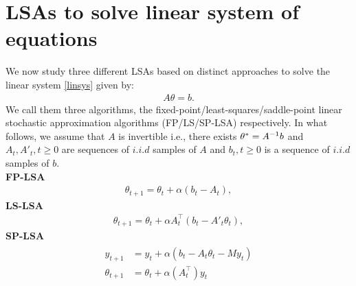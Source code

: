 \section{LSAs to solve linear system of equations}
We now study three different LSAs based on distinct approaches to solve the linear system \eqref{linsys} given by:
\begin{align}\label{linsys}
A\theta=b.
\end{align}
We call them three algorithms, the fixed-point/least-squares/saddle-point linear stochastic approximation algorithms (FP/LS/SP-LSA) respectively. In what follows, we assume that
$A$ is invertible i.e., there exists $\theta^*=A^{-1} b$ and $A_t,A'_t, t\geq 0$ are sequences of $i.i.d$ samples of $A$ and $b_t,t\geq 0$ is a sequence of $i.i.d$ samples of $b$.\\
\textbf{FP-LSA}
\begin{align}\label{fplsa}
\theta_{t+1}=\theta_t+\alpha(b_t-A_t),
\end{align}
\textbf{LS-LSA}
\begin{align}\label{lslsa}
\theta_{t+1}=\theta_t+\alpha A^\top_t(b_t-A'_t\theta_t),
\end{align}
\textbf{SP-LSA}
\begin{align}\label{splsa}
\begin{split}
y_{t+1}&=y_t+\alpha (b_t-A_t\theta_t- M y_t)\\
\theta_{t+1}&=\theta_t+\alpha(A_t^\top)y_t
\end{split}
\end{align}

